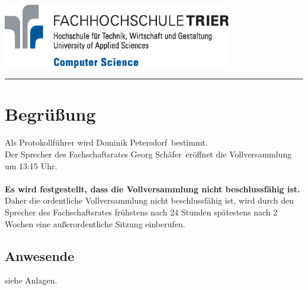 \documentclass[a4paper, 11pt]{article} %
\newcommand{\protokoller}{Dominik Petersdorf}
\newcommand{\dateOfMeeting}{12. Mai 2015}
\newcommand{\TeXer}{Dominik Petersdorf}
\newcommand{\fsiPresident}{Georg Schäfer}
\begin{document}

\doublespacing
\thispagestyle{empty}

\begin{center}
\includegraphics[width=10.0cm]{../logo_faculty_computer_science.eps}

\vspace*{\fill}

\vfill
\end{center}

\hspace*{-35cm}
\textcolor{fsi}{\rule{64.9cm}{15pt}}
\pagebreak
 
\setcounter{tocdepth}{2}
\tableofcontents 
\pagebreak

\section{Begrüßung}
Als Protokollführer wird \protokoller~bestimmt.\\
Der Sprecher des Fachschaftsrates \fsiPresident~eröffnet die Vollversammlung um 13:15 Uhr.
\\\\
\textbf{Es wird festgestellt, dass die Vollversammlung nicht beschlussfähig ist.}
Daher die ordentliche Vollversammlung nicht beschlussfähig ist, wird durch den Sprecher des Fachschaftsrates frühstens nach 24 Stunden spätestens nach 2 Wochen eine außerordentliche Sitzung einberufen.
\subsection{Anwesende}
siehe Anlagen.
\end{document}
